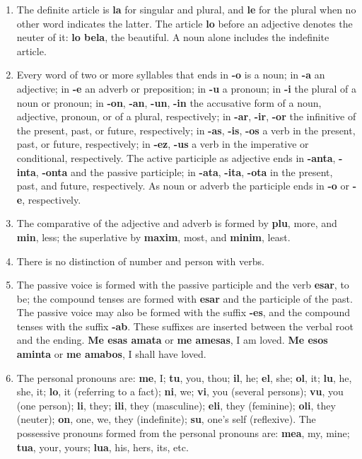 \begin{enumerate}
    \item The definite article is \textbf{la} for singular and plural, and \textbf{le} for the plural when no other word indicates the latter. The article \textbf{lo} before an adjective denotes the neuter of it: \textbf{lo bela}, the beautiful. A noun alone includes the indefinite article.
    \item Every word of two or more syllables that ends in \textbf{-o} is a noun; in \textbf{-a} an adjective; in \textbf{-e} an adverb or preposition; in \textbf{-u} a pronoun; in \textbf{-i} the plural of a noun or pronoun; in \textbf{-on}, \textbf{-an}, \textbf{-un}, \textbf{-in} the accusative form of a noun, adjective, pronoun, or of a plural, respectively; in \textbf{-ar}, \textbf{-ir}, \textbf{-or} the infinitive of the present, past, or future, respectively; in \textbf{-as}, \textbf{-is}, \textbf{-os} a verb in the present, past, or future, respectively; in \textbf{-ez}, \textbf{-us} a verb in the imperative or conditional, respectively. The active participle as adjective ends in \textbf{-anta}, \textbf{-inta}, \textbf{-onta} and the passive participle; in \textbf{-ata}, \textbf{-ita}, \textbf{-ota} in the present, past, and future, respectively. As noun or adverb the participle ends in \textbf{-o} or \textbf{-e}, respectively.
    \item The comparative of the adjective and adverb is formed by \textbf{plu}, more, and \textbf{min}, less; the superlative by \textbf{maxim}, most, and \textbf{minim}, least.
    \item There is no distinction of number and person with verbs. 
    \item The passive voice is formed with the passive participle and the verb \textbf{esar}, to be; the compound tenses are formed with \textbf{esar} and the participle of the past. The passive voice may also be formed with the suffix \textbf{-es}, and the compound tenses with the suffix \textbf{-ab}. These suffixes are inserted between the verbal root and the ending. \textbf{Me esas amata} or \textbf{me amesas}, I am loved. \textbf{Me esos aminta} or \textbf{me amabos}, I shall have loved. 
    \item The personal pronouns are: \textbf{me}, I; \textbf{tu}, you, thou; \textbf{il}, he; \textbf{el}, she; \textbf{ol}, it; \textbf{lu}, he, she, it; \textbf{lo}, it (referring to a fact); \textbf{ni}, we; \textbf{vi}, you (several persons); \textbf{vu}, you (one person); \textbf{li}, they; \textbf{ili}, they (masculine); \textbf{eli}, they (feminine); \textbf{oli}, they (neuter); \textbf{on}, one, we, they (indefinite); \textbf{su}, one’s self (reflexive). The possessive pronouns formed from the personal pronouns are: \textbf{mea}, my, mine; \textbf{tua}, your, yours; \textbf{lua}, his, hers, its, etc. 

\end{enumerate}
